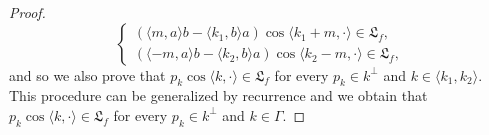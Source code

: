 \documentclass[10pt]{article}
\newcommand{\la}{\langle}
\newcommand{\ra}{\rangle}
\begin{document}
\begin{proof}
    \begin{equation*}
        \left\{ \begin{array}{ll}
             (\la m,a\ra b-\la k_1,b\ra a)\cos \la k_1+m,\cdot\ra \in \mathfrak{L}_f,   \\
             (\la -m,a\ra b-\la k_2,b\ra a) \cos \la k_2-m, \cdot \ra \in \mathfrak{L}_f,  
        \end{array}\right.
    \end{equation*}
    and so we also prove that $p_k \cos \la k,\cdot \ra \in \mathfrak{L}_f$ for every $p_k\in k^{\perp}$ and $k \in \la k_1,k_2 \ra$. This procedure can be generalized by recurrence and we obtain that $p_k \cos \la k,\cdot \ra \in \mathfrak{L}_f$ for every $p_k\in k^{\perp}$ and $k \in  \Gamma$. 
    \end{proof}
\end{document}
